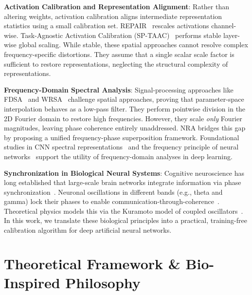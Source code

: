 \documentclass{article}
\theoremstyle{plain}
\theoremstyle{definition}
\theoremstyle{remark}
\begin{document}
\textbf{Activation Calibration and Representation Alignment}: Rather than altering weights, activation calibration aligns intermediate representation statistics using a small calibration set. REPAIR~\cite{jordan2022repair} rescales activations channel-wise. Task-Agnostic Activation Calibration (SP-TAAC)~\cite{anonymous2026sptaac} performs stable layer-wise global scaling. While stable, these spatial approaches cannot resolve complex frequency-specific distortions. They assume that a single scalar scale factor is sufficient to restore representations, neglecting the structural complexity of representations.

\textbf{Frequency-Domain Spectral Analysis}: Signal-processing approaches like FDSA~\cite{visionary2026fdsa} and WRSA~\cite{theorist2026wrsa} challenge spatial approaches, proving that parameter-space interpolation behaves as a low-pass filter. They perform pointwise division in the 2D Fourier domain to restore high frequencies. However, they scale \textit{only} Fourier magnitudes, leaving phase coherence entirely unaddressed. NRA bridges this gap by proposing a unified frequency-phase superposition framework. Foundational studies in CNN spectral representations~\cite{rippel2015spectral} and the frequency principle of neural networks~\cite{xu2019frequency} support the utility of frequency-domain analyses in deep learning.

\textbf{Synchronization in Biological Neural Systems}: Cognitive neuroscience has long established that large-scale brain networks integrate information via phase synchronization~\cite{varela2001brainweb, singer1999neuronal}. Neuronal oscillations in different bands (e.g., theta and gamma) lock their phases to enable communication-through-coherence~\cite{fries2005mechanism}. Theoretical physics models this via the Kuramoto model of coupled oscillators~\cite{kuramoto1975self, strogatz2000kuramoto}. In this work, we translate these biological principles into a practical, training-free calibration algorithm for deep artificial neural networks.

\section{Theoretical Framework \& Bio-Inspired Philosophy}
\label{submission-framework}
\end{document}
